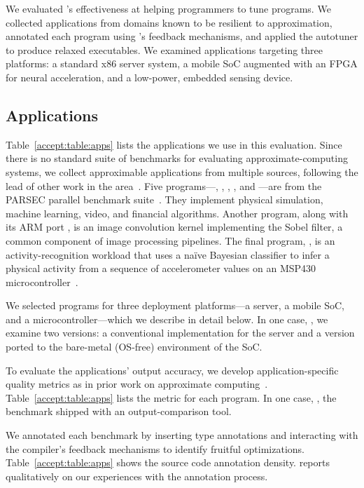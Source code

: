 We evaluated \sysname's effectiveness at helping programmers
to tune programs.
We collected applications from domains known to be resilient to approximation,
annotated each program using \sysname's feedback mechanisms, and applied the
autotuner to produce relaxed executables.
We examined applications targeting three platforms:
a standard x86 server system,
a mobile SoC augmented with an FPGA for neural acceleration,
and a low-power, embedded sensing device.

\subsection{Applications}

Table~\ref{accept:table:apps} lists the applications we use in this evaluation. Since
there is no standard suite of benchmarks for evaluating approximate-computing
systems, we collect approximable applications from multiple sources,
following the lead of other work in the area~\cite{enerj, npu, benchnn,
qosprof, temam-isca}. Five programs---, ,
, , and ---are from the PARSEC
parallel benchmark suite~\cite{parsec}.
They implement physical simulation, machine learning, video, and financial
algorithms.
Another program,  along
with its ARM port , is an
image convolution kernel implementing the Sobel
filter, a common component of image processing pipelines.
The final program, , is an activity-recognition workload that
uses a na\"ive Bayesian classifier to
infer a physical activity from a sequence of accelerometer values on an MSP430
microcontroller~\cite{www:msp430}.

We selected programs for three deployment platforms---a server, a mobile SoC,
and a microcontroller---which we describe in detail below.
In one case, , we examine two versions: a conventional
implementation for the server and a version ported to the bare-metal (OS-free)
environment of the SoC.

To evaluate the applications' output accuracy, we
develop application-specific quality metrics as in prior work on approximate
computing~\cite{enerj, green,
qosprof, npu, truffle}.
Table~\ref{accept:table:apps} lists the metric for each program.
In one case,
, the benchmark shipped with an output-comparison tool.

We annotated each benchmark by inserting type annotations and
interacting with the compiler's feedback mechanisms to identify fruitful
optimizations.
Table~\ref{accept:table:apps} shows the source code annotation density.
 reports qualitatively on our experiences with the
annotation process.

